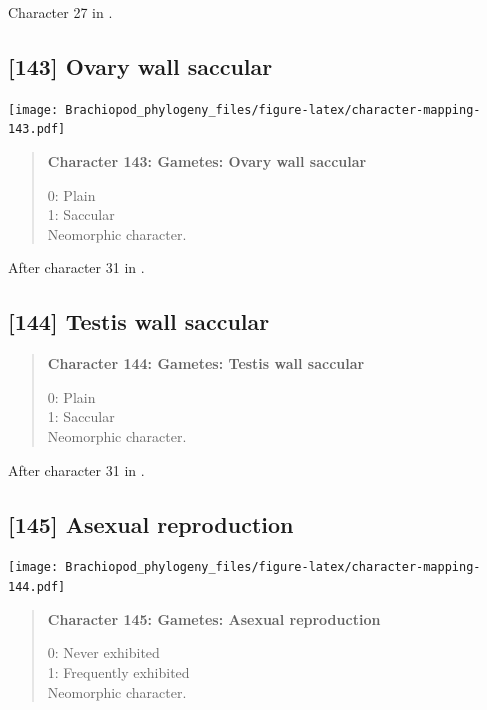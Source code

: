 \documentclass[openany]{book}
\begin{document}
Character 27 in \citet{Haszprunar1996}.

\subsection*{{[}143{]} Ovary wall saccular}\label{ovary-wall-saccular}

\texttt{[image: Brachiopod\_phylogeny\_files/figure-latex/character-mapping-143.pdf]}

\begin{quote}
\textbf{Character 143: Gametes: Ovary wall saccular}

0: Plain\\
1: Saccular\\
Neomorphic character.
\end{quote}

After character 31 in \citet{Haszprunar1996}.

\subsection*{{[}144{]} Testis wall saccular}\label{testis-wall-saccular}

\begin{quote}
\textbf{Character 144: Gametes: Testis wall saccular}

0: Plain\\
1: Saccular\\
Neomorphic character.
\end{quote}

After character 31 in \citet{Haszprunar1996}.

\subsection*{{[}145{]} Asexual reproduction}\label{asexual-reproduction}

\texttt{[image: Brachiopod\_phylogeny\_files/figure-latex/character-mapping-144.pdf]}

\begin{quote}
\textbf{Character 145: Gametes: Asexual reproduction}

0: Never exhibited\\
1: Frequently exhibited\\
Neomorphic character.
\end{quote}
\end{document}
